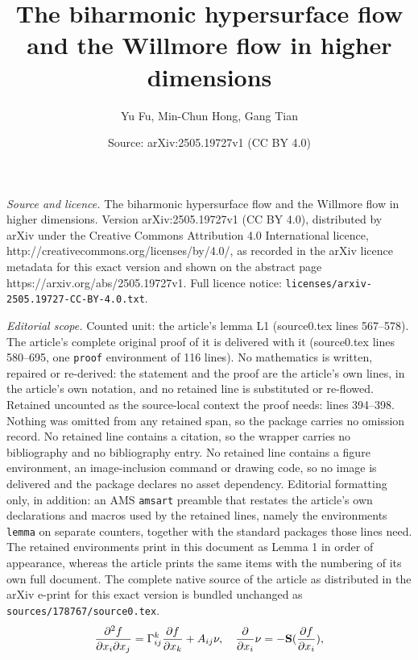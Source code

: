 \documentclass[10pt,a4paper]{amsart}
\title{The biharmonic hypersurface flow and the Willmore flow in higher dimensions}
\author{Yu Fu, Min-Chun Hong, Gang Tian}
\date{Source: arXiv:2505.19727v1 (CC BY 4.0)}
\begin{document}
\maketitle

\noindent\emph{Source and licence.} The biharmonic hypersurface flow and the Willmore flow in higher dimensions. Version arXiv:2505.19727v1 (CC BY 4.0), distributed by arXiv under the Creative Commons Attribution 4.0 International licence, http://creativecommons.org/licenses/by/4.0/, as recorded in the arXiv licence metadata for this exact version and shown on the abstract page https://arxiv.org/abs/2505.19727v1. Full licence notice: \texttt{licenses/arxiv-2505.19727-CC-BY-4.0.txt}.\par\smallskip

\noindent\textit{Editorial scope.} Counted unit: the article's lemma L1 (source0.tex lines 567--578). The article's complete original proof of it is delivered with it (source0.tex lines 580--695, one \texttt{proof} environment of 116 lines). No mathematics is written, repaired or re-derived: the statement and the proof are the article's own lines, in the article's own notation, and no retained line is substituted or re-flowed.  Retained uncounted as the source-local context the proof needs: lines 394--398.  Nothing was omitted from any retained span, so the package carries no omission record.  No retained line contains a citation, so the wrapper carries no bibliography and no bibliography entry.  No retained line contains a figure environment, an image-inclusion command or drawing code, so no image is delivered and the package declares no asset dependency.  Editorial formatting only, in addition: an AMS \texttt{amsart} preamble that restates the article's own declarations and macros used by the retained lines, namely the environments \texttt{lemma} on separate counters, together with the standard packages those lines need.  The retained environments print in this document as Lemma 1 in order of appearance, whereas the article prints the same items with the numbering of its own full document.  The complete native source of the article as distributed in the arXiv e-print for this exact version is bundled unchanged as \texttt{sources/178767/source0.tex}.
\begin{align}\label{GW}
\frac{\partial^2 f}{\partial x_i \partial
    x_j}=\Gamma_{ij}^k\frac{\partial f}{\partial x_k}+A_{ij}\nu,\quad
\frac{\partial}{\partial x_i} \nu=-{{}\bf S} (\frac{\partial f}{\partial x_i}),
\end{align}
\end{document}

